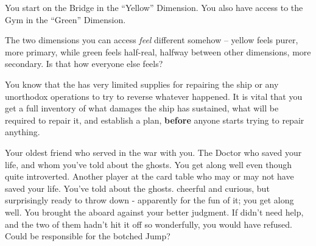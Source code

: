 \documentclass[char]{TMFHope}
\begin{document}
\begin{itemz}[Notes]
	\item You start on the Bridge in the ``Yellow'' Dimension. You also have access to the Gym in the ``Green'' Dimension. 
	\item The two dimensions you can access {\em feel} different somehow -- yellow feels purer, more primary, while green feels half-real, halfway between other dimensions, more secondary.  Is that how everyone else feels?
	\item You know that the \pNew{} has very limited supplies for repairing the ship or any unorthodox operations to try to reverse whatever happened. It is vital that you get a full inventory of what damages the ship has sustained, what will be required to repair it, and establish a plan, {\bf before} anyone starts trying to repair anything.
\end{itemz}

\begin{contacts}
	\contact{\cXO{}} Your oldest friend who served in the war with you.
	\contact{\cMed{}} The Doctor who saved your life, and whom you've told about the ghosts. You get along well even though \cMed{\they} \cMed{\are} quite introverted.
	\contact{\cSci{}} Another player at the card table who may or may not have saved your life. You've told \cSci{\them} about the ghosts. \cSci{\They} \cSci{\are} cheerful and curious, but surprisingly ready to throw down - apparently for the fun of it; you get along well.
	\contact{\cBoy{}} You brought the \cBoy{\kid} aboard against your better judgment. If \cEng{} didn't need help, and the two of them hadn't hit it off so wonderfully, you would have refused. Could \cBoy{} be responsible for the botched Jump?
\end{contacts}
\end{document}
